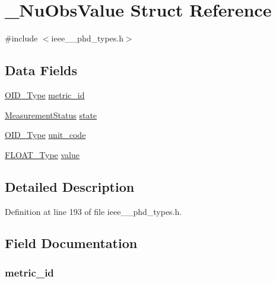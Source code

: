 \hypertarget{struct___nu_obs_value}{}\section{\+\_\+\+Nu\+Obs\+Value Struct Reference}
\label{struct___nu_obs_value}


{\ttfamily \#include $<$ieee\+\_\+\_\+phd\+\_\+types.\+h$>$}

\subsection*{Data Fields}
\begin{DoxyCompactItemize}
\item 
\hyperlink{ieee__11073__phd__types_8h_aa4d7af235d4a95d6632aa0d64160dd62}{O\+I\+D\+\_\+\+Type} \hyperlink{struct___nu_obs_value_ad9122266e1be3ec211d15c7f3615cca7}{metric\+\_\+id}
\item 
\hyperlink{ieee__11073__phd__types_8h_a23659054d19145982be64810157706df}{Measurement\+Status} \hyperlink{struct___nu_obs_value_a13d01c3f9f21fd12a22772c0e1b7d88b}{state}
\item 
\hyperlink{ieee__11073__phd__types_8h_aa4d7af235d4a95d6632aa0d64160dd62}{O\+I\+D\+\_\+\+Type} \hyperlink{struct___nu_obs_value_a1bc4b9eecd5c78485b24d8fb14c91398}{unit\+\_\+code}
\item 
\hyperlink{ieee__11073__phd__types_8h_af070130e724f8e6babaa500f89591392}{F\+L\+O\+A\+T\+\_\+\+Type} \hyperlink{struct___nu_obs_value_ac7ab47e6d1990917b05d22ecaddb0a00}{value}
\end{DoxyCompactItemize}


\subsection{Detailed Description}


Definition at line 193 of file ieee\+\_\+\_\+phd\+\_\+types.\+h.



\subsection{Field Documentation}
\hypertarget{struct___nu_obs_value_ad9122266e1be3ec211d15c7f3615cca7}{}
\subsubsection[{metric\+\_\+id}]{ metric\+\_\+id}\label{struct___nu_obs_value_ad9122266e1be3ec211d15c7f3615cca7}


